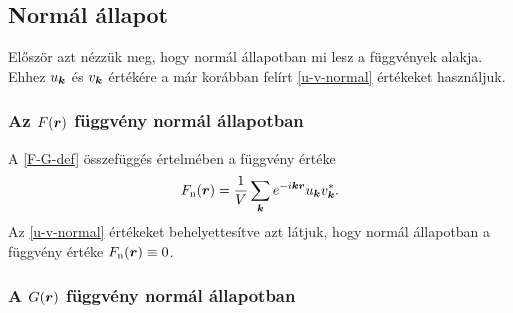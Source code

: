 \documentclass[a4paper,12pt,titlepage]{article}
\newcommand{\KK}{{\vb*{k}}}
\newcommand{\RR}{{\vb*{r}}}
\begin{document}
\subsection{Normál állapot}

Először azt nézzük meg, hogy normál állapotban mi lesz a függvények alakja.  Ehhez $u_\KK$ és $v_\KK$ értékére a már korábban felírt \eqref{u-v-normal} értékeket használjuk.

\subsubsection{Az $F(\RR)$ függvény normál állapotban}

A \eqref{F-G-def} összefüggés értelmében a függvény értéke
\begin{equation}
	F_\text{n}(\RR) = \frac{1}{V} \sum\limits_\KK e^{-i \KK \RR} u_\KK v_\KK^*.
\end{equation}
Az \eqref{u-v-normal} értékeket behelyettesítve azt látjuk, hogy normál állapotban a függvény értéke $F_\text{n}(\RR) \equiv 0$.


\subsubsection{A $G(\RR)$ függvény normál állapotban}
\end{document}
